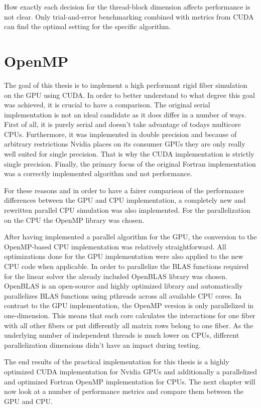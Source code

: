 \documentclass[a4paper,11pt]{kth-mag}
\begin{document}
How exactly each decision for the thread-block dimension affects performance is not clear. Only trial-and-error benchmarking combined with metrics from CUDA can find the optimal setting for the specific algorithm.

\section{OpenMP}

The goal of this thesis is to implement a high performant rigid fiber simulation on the GPU using CUDA. In order to better understand to what degree this goal was achieved, it is crucial to have a comparison. The original serial implementation is not an ideal candidate as it does differ in a number of ways. First of all, it is purely serial and doesn't take advantage of todays multicore CPUs. Furthermore, it was implemented in double precision and because of arbitrary restrictions Nvidia places on its consumer GPUs they are only really well suited for single precision. That is why the CUDA implementation is strictly single precision. Finally, the primary focus of the original Fortran implementation was a correctly implemented algorithm and not performance.

For these reasons and in order to have a fairer comparison of the performance differences between the GPU and CPU implementation, a completely new and rewritten parallel CPU simulation was also implemented. For the parallelization on the CPU the OpenMP library was chosen.

After having implemented a parallel algorithm for the GPU, the conversion to the OpenMP-based CPU implementation was relatively straightforward. All optimizations done for the GPU implementation were also applied to the new CPU code when applicable. In order to parallelize the BLAS functions required for the linear solver the already included OpenBLAS library was chosen. OpenBLAS is an open-source and highly optimized library and automatically parallelizes BLAS functions using pthreads across all available CPU cores. In contrast to the GPU implementation, the OpenMP version is only parallelized in one-dimension. This means that each core calculates the interactions for one fiber with all other fibers or put differently all matrix rows belong to one fiber. As the underlying number of independent threads is much lower on CPUs, different parallelization dimensions didn't have an impact during testing.

The end results of the practical implementation for this thesis is a highly optimized CUDA implementation for Nvidia GPUs and additionally a parallelized and optimized Fortran OpenMP implementation for CPUs. The next chapter will now look at a number of performance metrics and compare them between the GPU and CPU.
\end{document}
